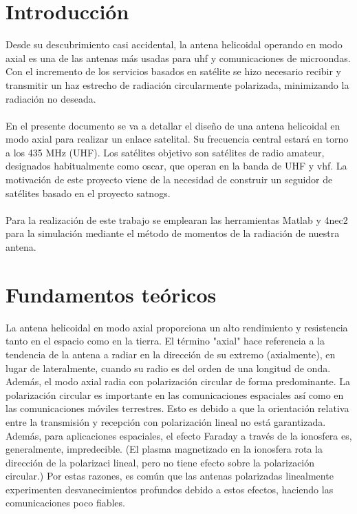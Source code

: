 \documentclass[12pt]{article}
\begin{document}
\tableofcontents
\pagebreak


\section{Introducción}
Desde su descubrimiento casi accidental, la antena helicoidal operando en modo axial es una de las antenas más usadas para \gls{uhf} y comunicaciones de microondas. Con el incremento de los servicios basados en satélite se hizo necesario recibir y transmitir un haz estrecho de radiación circularmente polarizada, minimizando la radiación no deseada.\\\\
En el presente documento se va a detallar el diseño de una antena helicoidal en modo axial para realizar un enlace satelital. Su frecuencia central estará en torno a los 435 MHz (UHF). Los satélites objetivo son satélites de radio amateur, designados habitualmente como \gls{oscar}, que operan en la banda de UHF y \gls{vhf}. La motivación de este proyecto viene de la necesidad de construir un seguidor de satélites basado en el proyecto \gls{satnogs}.\\\\
Para la realización de este trabajo se emplearan las herramientas Matlab y 4nec2 para la simulación mediante el método de momentos de la radiación de nuestra antena.

\newpage
\section{Fundamentos teóricos}
La antena helicoidal en modo axial proporciona un alto rendimiento y resistencia tanto en el espacio como en la tierra. El término "axial" hace referencia a la tendencia de la antena a radiar en la dirección de su extremo (axialmente), en lugar de lateralmente, cuando su radio es del orden de una longitud de onda. Además, el modo axial radia con polarización circular de forma predominante. La polarización circular es importante en las comunicaciones espaciales así como en las comunicaciones móviles terrestres. Esto es debido a que la orientación relativa entre la transmisión y recepción con polarización lineal no está garantizada. Además, para aplicaciones espaciales, el efecto Faraday a través de la ionosfera es, generalmente, impredecible. (El plasma magnetizado en la ionosfera rota la dirección de la polarizaci lineal, pero no tiene efecto sobre la polarización circular.) Por estas razones, es común que las antenas polarizadas linealmente experimenten desvanecimientos profundos debido a estos efectos, haciendo las comunicaciones poco fiables. 
\end{document}
